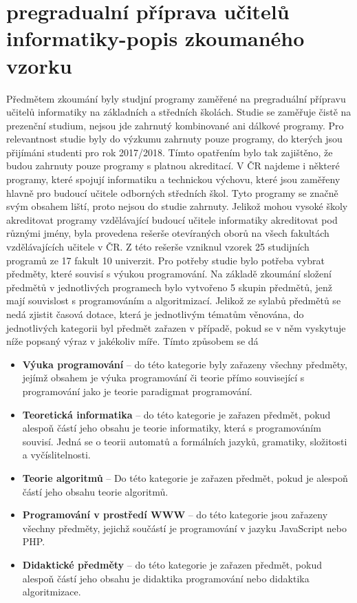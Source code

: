 \documentclass[FP,DP]{tulthesis}
\begin{document}
{{{{{{{\section{pregradualní příprava učitelů informatiky-popis zkoumaného vzorku}
Předmětem zkoumání byly studjní programy zaměřené na pregraduální přípravu učitelů informatiky na základních a středních školách. Studie se zaměřuje čistě na prezenční studium, nejsou jde zahrnutý kombinované ani dálkové programy. Pro relevantnost studie byly do výzkumu zahrnuty pouze programy, do kterých jsou přijímáni studenti pro rok 2017/2018. Tímto opatřením bylo tak zajištěno, že budou zahrnuty pouze programy s platnou akreditací. V ČR najdeme i některé programy, které spojují informatiku a technickou výchovu, které jsou zaměřeny hlavně pro budoucí učitele odborných středních škol. Tyto programy se značně svým obsahem liští, proto nejsou do studie zahrnuty.
Jelikož mohou vysoké školy akreditovat programy vzdělávající budoucí učitele informatiky akreditovat pod různými jmény, byla provedena rešerše otevíraných oborů na všech fakultách vzdělávajících učitele v ČR. Z této rešerše vzniknul vzorek 25 studijních programů ze 17 fakult 10 univerzit.
Pro potřeby studie bylo potřeba vybrat předměty, které souvisí s výukou programování. Na základě zkoumání složení předmětů v jednotlivých programech bylo vytvořeno 5 skupin předmětů, jenž mají souvislost s programováním a algoritmizací.  Jelikož ze sylabů předmětů se nedá zjistit časová dotace, která je jednotlivým tématům věnována, do jednotlivých kategorii byl předmět zařazen v případě, pokud se v něm vyskytuje níže popsaný výraz v jakékoliv míře. Tímto způsobem se dá 
\vspace{2mm}\begin{itemize}[nosep]
  	\item \textbf{Výuka programování} -- do této kategorie byly zařazeny všechny předměty, jejímž obsahem je výuka programování či teorie přímo související s programování jako je teorie paradigmat programování.
	\item \textbf{Teoretická informatika} -- do této kategorie je zařazen předmět, pokud alespoň částí jeho obsahu je teorie informatiky, která s programováním souvisí. Jedná se o teorii automatů a formálních jazyků, gramatiky, složitosti a vyčíslitelnosti.
	\item\textbf{Teorie algoritmů} -- Do této kategorie je zařazen předmět, pokud je alespoň částí jeho obsahu teorie algoritmů.
	\item \textbf{Programování v prostředí WWW } -- do této kategorie jsou zařazeny všechny předměty, jejichž součástí je programování v jazyku JavaScript nebo PHP.
\item \textbf{Didaktické předměty } -- do této kategorie je zařazen předmět, pokud alespoň částí jeho obsahu je didaktika programování nebo didaktika algoritmizace.
\end{itemize}






}}}}}}}
\end{document}
